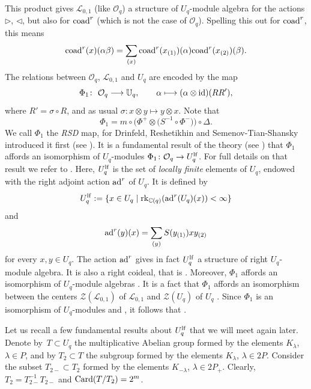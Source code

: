 \documentclass[pdftex]{sigma}
\numberwithin{equation}{section}
\theoremstyle{definition}
\newcommand{\mUq}{\mathbb{U}_q}
\newcommand{\mc}{\mathbb{C}}
\newcommand{\Ll}{{\mathcal L}}
\newcommand{\Oo}{{\mathcal O}}
\newcommand{\ra}{\rightarrow}
\begin{document}
This product gives $\Ll_{0,1}$ (like $\Oo_q$) a structure of $U_q$-module algebra for the actions $\rhd$, $\lhd$, but also for ${\rm coad}^r$ (which is not the case of $\Oo_q$). Spelling this out for ${\rm coad}^r$, this means
\[{\rm coad}^r(x)(\alpha\beta)=\sum_{(x)}{\rm coad}^r(x_{(1)})(\alpha){\rm coad}^r(x_{(2)})(\beta).\]
The relations between $\Oo_q$, $\Ll_{0,1}$ and $U_q$ are encoded by the map
\begin{equation}\label{phi1def}
\Phi_1\colon\ \Oo_q\longrightarrow \mUq, \qquad \alpha\longmapsto(\alpha \otimes {\rm id})(RR'),
\end{equation}
where $R' = \sigma\circ R$, and as usual $\sigma\colon x\otimes y \mapsto y\otimes x$. Note that
\begin{equation}\label{RSDmapdef}
\Phi_1 = m\circ \big(\Phi^+\otimes \big(S^{-1}\circ \Phi^-{}\big)\big)\circ \Delta.
\end{equation}
We call $\Phi_1$ the {\it RSD} map, for Drinfeld, Reshetikhin and Semenov-Tian-Shansky introduced it first (see \cite{Dr,Maj,RSTS}). It is a fundamental result of the theory (see \cite{Bau1,Ca,Jos}) that $\Phi_1$ affords an isomorphism of $U_q$-modules
$\Phi_1\colon \Oo_q \ra U_q^{\rm lf}$.
For full details on that result we refer to \cite[Section 3.12]{VY}. Here, $U_q^{\rm lf}$ is the set of \emph{locally finite} elements of $U_q$, endowed with the right adjoint action ${\rm ad}^r$ of $U_q$. It is defined by
\[U_q^{\rm lf} :=\{x\in U_q\mid {\rm rk}_{\mc(q)}({\rm ad}^r(U_q)(x)) < \infty\}\]
and
\[{\rm ad}^r(y)(x) = \sum_{(y)}{S}(y_{(1)}) x y_{(2)}\]
for every $x,y \in U_q$. The action ${\rm ad}^r$ gives in fact $U_q^{\rm lf}$ a structure of right $U_q$-module algebra. It is also a right coideal, that is . Moreover, $\Phi_1$ affords an isomorphism of $U_q$-module algebras \smash{$
\Phi_1\colon \Ll_{0,1} \ra U_q^{\rm lf}$}.
It is a fact that $\Phi_1$ affords an isomorphism between the centers $\mathcal{Z}(\Ll_{0,1})$ of $\Ll_{0,1}$ and $\mathcal{Z}(U_q)$ of $U_q$ \cite[Proposition~6.24]{BR}. Since $\Phi_1$ is an isomorphism of $U_q$-modules and , it follows that \smash{$\mathcal{Z}(\Ll_{0,1}) = \Ll_{0,1}^{U_q}$}.

Let us recall a few fundamental results about $U_q^{\rm lf}$ that we will meet again later. Denote by~${T\subset U_q}$ the multiplicative Abelian group formed by the elements $K_{\lambda}$, $\lambda \in P$, and by $T_2\subset T$ the subgroup formed by the elements $K_{\lambda}$, $\lambda \in 2P$. Consider the subset $T_{2-} \subset T_2$ formed by the elements $K_{-\lambda}$, $\lambda \in 2P_+$. Clearly, $T_2 = T_{2-}^{-1}T_{2-}$ and ${\rm Card}(T/T_2) = 2^m$.
\end{document}
